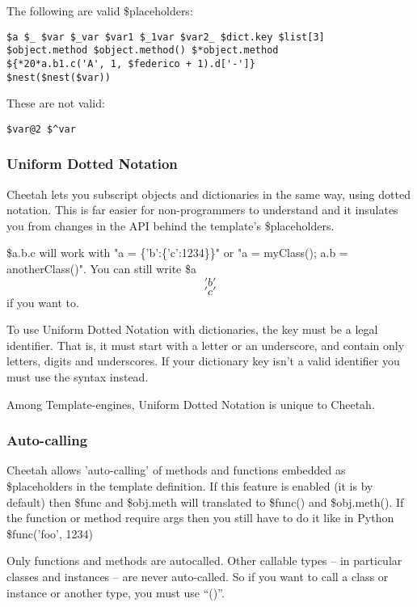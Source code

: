 The following are valid \$placeholders:
\begin{verbatim}
$a $_ $var $_var $var1 $_1var $var2_ $dict.key $list[3]
$object.method $object.method() $*object.method
${*20*a.b1.c('A', 1, $federico + 1).d['-']}
$nest($nest($var))
\end{verbatim}

These are not valid:
\begin{verbatim}
$var@2 $^var
\end{verbatim}
          
\subsubsection{Uniform Dotted Notation}
\label{TDL.placeholders.unifiedDottedNotation}

Cheetah lets you subscript objects and dictionaries in the same way, using
dotted notation.  This is far easier for non-programmers to understand and it
insulates you from changes in the API behind the template's \$placeholders.

\$a.b.c will work with "a = \{'b':\{'c':1234\}\}" or "a = myClass(); a.b =
anotherClass()". You can still write \$a\['b'\]\['c'\] if you want to.

To use Uniform Dotted Notation with dictionaries, the key must be a legal
identifier.  That is, it must start with a letter or an underscore, and contain
only letters, digits and underscores.  If your dictionary key isn't a valid
identifier you must use the  syntax instead.

Among Template-engines, Uniform Dotted Notation is unique to Cheetah.

\subsubsection{Auto-calling}
\label{TDL.placeholders.autocalling}

Cheetah allows 'auto-calling' of methods and functions embedded as
\$placeholders in the template definition.  If this feature is enabled
(it is by default) then \$func and \$obj.meth will translated to \$func() and
\$obj.meth().  If the function or method require args then you still
have to do it like in Python \$func('foo', 1234)

Only functions and methods are autocalled.  Other callable types -- in
particular classes and instances -- are never auto-called.  So if you want to
call a class or instance or another type, you must use ``()''.

